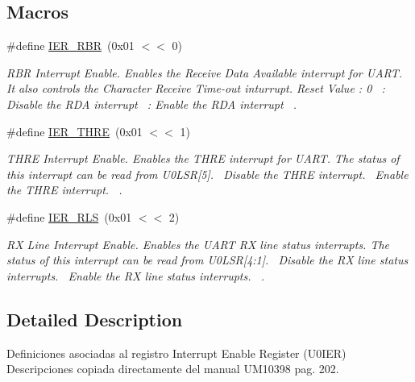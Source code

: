 \subsection*{Macros}
\begin{DoxyCompactItemize}
\item 
\#define \hyperlink{group___r_e_g_i_s_t_r_o___i_e_r_ga6f8e43123ccd9f9be70e2e4e761fd8bf}{I\+E\+R\+\_\+\+R\+BR}~(0x01 $<$$<$ 0)
\begin{DoxyCompactList}\small\item\em R\+BR Interrupt Enable. Enables the Receive Data Available interrupt for U\+A\+RT. It also controls the Character Receive Time-\/out inturrupt. Reset Value \+: 0~ \+: Disable the R\+DA interrupt~ \+: Enable the R\+DA interrupt~\newline
. \end{DoxyCompactList}\item 
\#define \hyperlink{group___r_e_g_i_s_t_r_o___i_e_r_ga22682c3d4571d7a79ed0ca2bc88a15a6}{I\+E\+R\+\_\+\+T\+H\+RE}~(0x01 $<$$<$ 1)
\begin{DoxyCompactList}\small\item\em T\+H\+RE Interrupt Enable. Enables the T\+H\+RE interrupt for U\+A\+RT. The status of this interrupt can be read from U0\+L\+SR\mbox{[}5\mbox{]}.~ Disable the T\+H\+RE interrupt.~ Enable the T\+H\+RE interrupt.~\newline
. \end{DoxyCompactList}\item 
\#define \hyperlink{group___r_e_g_i_s_t_r_o___i_e_r_gaec947c63128590c8f615862ee9c2c953}{I\+E\+R\+\_\+\+R\+LS}~(0x01 $<$$<$ 2)
\begin{DoxyCompactList}\small\item\em RX Line Interrupt Enable. Enables the U\+A\+RT RX line status interrupts. The status of this interrupt can be read from U0\+L\+SR\mbox{[}4\+:1\mbox{]}.~ Disable the RX line status interrupts.~ Enable the RX line status interrupts.~\newline
. \end{DoxyCompactList}\end{DoxyCompactItemize}


\subsection{Detailed Description}
Definiciones asociadas al registro Interrupt Enable Register (U0\+I\+ER)~\newline
 Descripciones copiada directamente del manual U\+M10398 pag. 202. 

